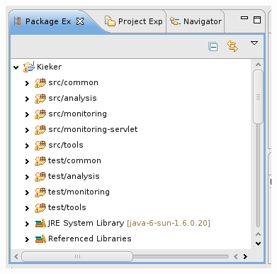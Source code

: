 \begin{compactenum}
\begin{compactenum}
\begin{figure}[H]\centering
\includegraphics[scale=0.4]{figures/eclipse-ProjectTree}
\caption{}
\label{fig:eclipse:projectTree}
\end{figure}

\end{compactenum}
\end{compactenum}


